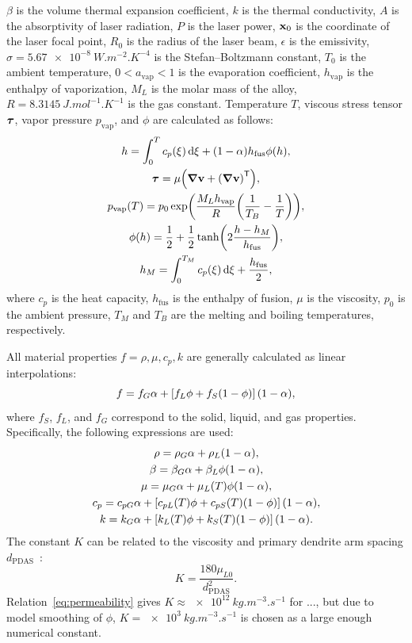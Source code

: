 \documentclass{article}
\newcommand{\tran}{\mathsf{T}} %
\newcommand{\fusion}[1]{{#1}_\mathrm{fus}}
\newcommand{\evapor}[1]{{#1}_\mathrm{vap}}
\newcommand{\bv}{\vb{v}}
\newcommand{\bx}{\vb{x}}
\newcommand{\btau}{\vb*\tau}
\begin{document}
$\beta$ is the volume thermal expansion coefficient,
$k$ is the thermal conductivity, $A$ is the absorptivity of laser radiation,
$P$ is the laser power, $\bx_0$ is the coordinate of the laser focal point,
$R_0$ is the radius of the laser beam, $\epsilon$ is the emissivity,
$\sigma=\SI{5.67e-8}{W.m^{-2}.K^{-4}}$ is the Stefan--Boltzmann constant,
$T_0$ is the ambient temperature,
$0 < \evapor{a} < 1$ is the evaporation coefficient,
$\evapor{h}$ is the enthalpy of vaporization,
$M_L$ is the molar mass of the alloy,
$R = \SI{8.3145}{J.mol^{-1}.K^{-1}}$ is the gas constant.
Temperature $T$, viscous stress tensor $\btau$, vapor pressure $\evapor{p}$,
and $\phi$ are calculated as follows:
\begin{gather}
    h = \int_0^T c_p(\xi)\dd{\xi} + (1-\alpha)\fusion{h}\phi(h), \label{eq:T}\\
    \btau = \mu\qty(\grad\bv + \qty(\grad\bv)^\tran), \label{eq:tau}\\
    \evapor{p}(T) = p_0\exp(\frac{M_L\evapor{h}}{R}\qty(\frac1{T_B}-\frac1{T})), \label{eq:p_evapor}\\
    \phi(h) = \frac12 + \frac12\tanh(2\frac{h-h_M}{\fusion{h}}), \label{eq:phi}\\
    h_M = \int_0^{T_M} c_p(\xi)\dd{\xi} + \frac{\fusion{h}}2, \label{eq:h_M}
\end{gather}
where $c_p$ is the heat capacity,
$\fusion{h}$ is the enthalpy of fusion, $\mu$ is the viscosity, 
$p_0$ is the ambient pressure,
$T_M$ and $T_B$ are the melting and boiling temperatures, respectively.

All material properties $f = \rho, \mu, c_p, k$ are generally calculated as linear interpolations:
\begin{equation}\label{eq:properties}
    f = f_G\alpha + \qty[f_L\phi + f_S(1-\phi)](1-\alpha),
\end{equation}
where $f_S$, $f_L$, and $f_G$ correspond to the solid, liquid, and gas properties.
Specifically, the following expressions are used:
\begin{gather}
    \rho = \rho_G\alpha + \rho_L(1-\alpha), \label{eq:rho}\\
    \beta = \beta_G\alpha + \beta_L\phi(1-\alpha), \label{eq:beta}\\
    \mu = \mu_G\alpha + \mu_L(T)\phi(1-\alpha), \label{eq:mu}\\
    c_p = c_{pG}\alpha + \qty[c_{pL}(T)\phi + c_{pS}(T)(1-\phi)](1-\alpha), \label{eq:c_p}\\
    k = k_G\alpha + \qty[k_L(T)\phi + k_S(T)(1-\phi)](1-\alpha). \label{eq:k}
\end{gather}
The constant $K$ can be related to the viscosity and primary dendrite arm spacing $d_\text{PDAS}$~\cite{kubo1985mathematical}:
\begin{equation}\label{eq:permeability}
    K = \frac{180\mu_{L0}}{d_\text{PDAS}^2}.
\end{equation}
Relation~\eqref{eq:permeability} gives $K \approx \SI{e12}{kg.m^{-3}.s^{-1}}$ for ...,
but due to model smoothing of $\phi$, $K = \SI{e3}{kg.m^{-3}.s^{-1}}$ is chosen as a large enough numerical constant.
\end{document}
